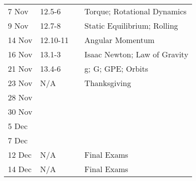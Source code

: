 \documentclass[12pt]{article}
\begin{document}
\begin{tabular}{llll}
7 Nov    & 12.5-6    &     & Torque; Rotational Dynamics \\
9 Nov    & 12.7-8    &     & Static Equilibrium; Rolling \\
14 Nov   & 12.10-11  &     & Angular Momentum \\
16 Nov   & 13.1-3    &     & Isaac Newton; Law of Gravity \\
21 Nov   & 13.4-6    &     & g; G; GPE; Orbits \\
23 Nov   & N/A       &     & Thanksgiving \\
28 Nov   &           &     &  \\
30 Nov   &           &     &  \\
5 Dec    &           &     &  \\
7 Dec    &           &     &  \\
12 Dec   & N/A       &     & Final Exams \\
14 Dec   & N/A       &     & Final Exams
\end{tabular}
\end{document}
